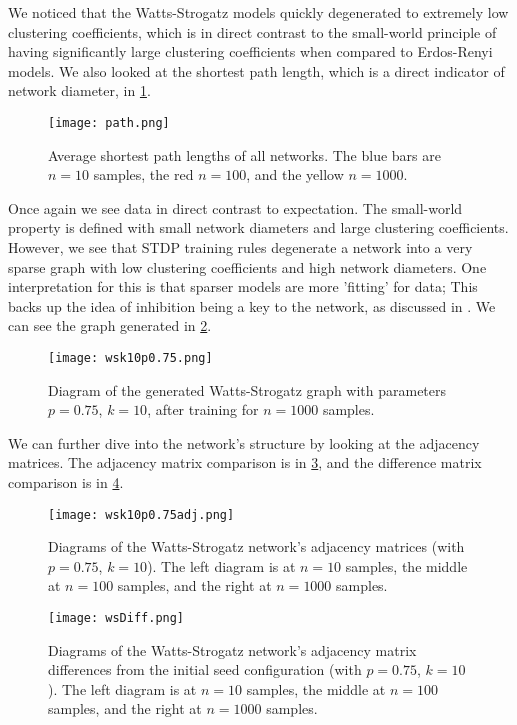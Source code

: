 We noticed that the Watts-Strogatz models quickly degenerated to extremely low
clustering coefficients, which is in direct contrast to the small-world
principle of having significantly large clustering coefficients when compared
to Erdos-Renyi models. We also looked at the shortest path length, which is a
direct indicator of network diameter, in \ref{fig:path}.

\begin{figure}[h]
    \centering
    \texttt{[image: path.png]}
    \caption{
        Average shortest path lengths of all networks. The blue bars are $n=10$
        samples, the red $n=100$, and the yellow $n=1000$.
    }
    \label{fig:path}
\end{figure}

Once again we see data in direct contrast to expectation. The small-world
property is defined with small network diameters and large clustering
coefficients. However, we see that STDP training rules degenerate a network into
a very sparse graph with low clustering coefficients and high network diameters.
One interpretation for this is that sparser models are more 'fitting' for data;
This backs up the idea of inhibition being a key to the network, as discussed
in \cite{Astrocyte}. We can see the graph generated in \ref{fig:wsk10p0.75}.

\begin{figure}[h]
    \centering
    \texttt{[image: wsk10p0.75.png]}
    \caption{
        Diagram of the generated Watts-Strogatz graph with parameters $p=0.75$,
        $k=10$, after training for $n=1000$ samples.
    }
    \label{fig:wsk10p0.75}
\end{figure}

We can further dive into the network's structure by looking at the adjacency
matrices. The adjacency matrix comparison is in \ref{fig:wsk10p0.75Adj}, and the
difference matrix comparison is in \ref{fig:wsDiff}.

\begin{figure}[h]
    \centering
    \texttt{[image: wsk10p0.75adj.png]}
    \caption{
        Diagrams of the Watts-Strogatz network's adjacency matrices (with
        $p=0.75$, $k=10$). The left diagram is at $n=10$ samples,
        the middle at $n=100$ samples, and the right at $n=1000$ samples.
    }
    \label{fig:wsk10p0.75Adj}
\end{figure}

\begin{figure}[h]
    \centering
    \texttt{[image: wsDiff.png]}
    \caption{
        Diagrams of the Watts-Strogatz network's adjacency matrix differences
        from the initial seed configuration (with $p=0.75$, $k=10$). The left
        diagram is at $n=10$ samples, the middle at $n=100$ samples, and the
        right at $n=1000$ samples.
    }
    \label{fig:wsDiff}
\end{figure}

